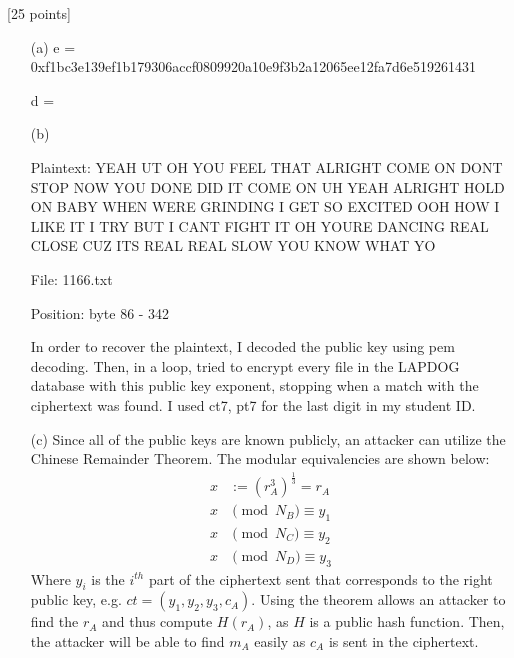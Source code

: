 \documentclass[11pt]{article}
\newcounter{qnum}
\newcommand{\question}[1]{\stepcounter{qnum}\bigskip\noindent{\bf \arabic{qnum}. #1.}}
\begin{document}
\question{RSA and factoring} [25 points] 
\begin{itemize}
  \item[(a)] 
  e =  0xf1bc3e139ef1b179306accf0809920a10e9f3b2a12065ee12fa7d6e519261431

  d = 
  \item[(b)] 

    Plaintext:
    YEAH UT OH YOU FEEL THAT ALRIGHT COME ON DONT STOP NOW YOU DONE DID IT COME ON UH YEAH 
    ALRIGHT HOLD ON BABY WHEN WERE GRINDING I GET SO EXCITED OOH HOW I LIKE IT I TRY BUT I 
    CANT FIGHT IT OH YOURE DANCING REAL CLOSE CUZ ITS REAL REAL SLOW YOU KNOW WHAT YO

    File: 1166.txt

    Position: byte 86 - 342

    In order to recover the plaintext, I decoded the public key using pem decoding. Then, in a 
    loop, tried to encrypt every file in the LAPDOG database with this public key exponent, 
    stopping when a match with the ciphertext was found. I used ct7, pt7 for the last digit in
    my student ID.

  \item[(c)]  Since all of the public keys are known publicly, an attacker can utilize the 
    Chinese Remainder Theorem.  The modular equivalencies are shown below:
    \begin{align}
      x& := (r_A^3)^{\frac{1}{3}} = r_A  \nonumber \\
      x& \pmod{ N_B} \equiv y_1 \nonumber \\
      x& \pmod{ N_C} \equiv y_2  \nonumber \\
      x& \pmod{ N_D} \equiv y_3  \nonumber
    \end{align}
    Where $y_i$ is the $i^{th}$ part of the ciphertext sent that corresponds to the right
    public key, e.g. $ct = (y_1, y_2, y_3, c_A).$
    Using the theorem allows an attacker to find the $r_A$ and thus compute $H(r_A)$, 
    as $H$ is a public hash function. Then, the attacker will be able to find $m_A$ easily as $c_A$
    is sent in the ciphertext.
\end{itemize}
\end{document}
